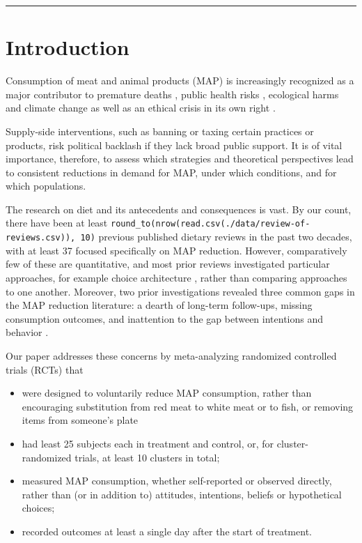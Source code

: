 \documentclass[sn-nature,pdflatex]{sn-jnl}
\begin{document}
\maketitle

\begin{center}\rule{0.5\linewidth}{0.5pt}\end{center}

\section{Introduction}\label{sec1}

Consumption of meat and animal products (MAP) is increasingly recognized
as a major contributor to premature deaths
\citep{willett2019, landry2023}, public health risks
\citep{slingenbergh2004, graham2008}, ecological harms
\citep{greger2010} and climate change
\citep{scarborough2023, koneswaran2008} as well as an ethical crisis in
its own right \citep{kuruc2023, singer2023}.

Supply-side interventions, such as banning or taxing certain practices
or products, risk political backlash if they lack broad public support.
It is of vital importance, therefore, to assess which strategies and
theoretical perspectives lead to consistent reductions in demand for
MAP, under which conditions, and for which populations.

The research on diet and its antecedents and consequences is vast. By
our count, there have been at least
\texttt{round\_to(nrow(read.csv(\textquotesingle{}./data/review-of-reviews.csv\textquotesingle{})),\ 10)}
previous published dietary reviews in the past two decades, with at
least 37 focused specifically on MAP reduction. However, comparatively
few of these are quantitative, and most prior reviews investigated
particular approaches, for example choice architecture
\citep{bianchi2018restructuring}, rather than comparing approaches to
one another. Moreover, two prior investigations revealed three common
gaps in the MAP reduction literature: a dearth of long-term follow-ups,
missing consumption outcomes, and inattention to the gap between
intentions and behavior \citep{mathur2021meta, mathur2021effectiveness}.

Our paper addresses these concerns by meta-analyzing randomized
controlled trials (RCTs) that

\begin{itemize}
\item
  were designed to voluntarily reduce MAP consumption, rather than
  encouraging substitution from red meat to white meat or to fish, or
  removing items from someone's plate
\item
  had least 25 subjects each in treatment and control, or, for
  cluster-randomized trials, at least 10 clusters in total;
\item
  measured MAP consumption, whether self-reported or observed directly,
  rather than (or in addition to) attitudes, intentions, beliefs or
  hypothetical choices;
\item
  recorded outcomes at least a single day after the start of treatment.
\end{itemize}
\end{document}
